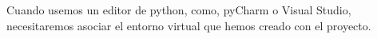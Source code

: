 \documentclass{article}
\begin{document}
Cuando usemos un editor de python, como, pyCharm o Visual Studio, necesitaremos asociar el entorno virtual que hemos creado con el proyecto.





    
            
        
        
        



\end{document}
